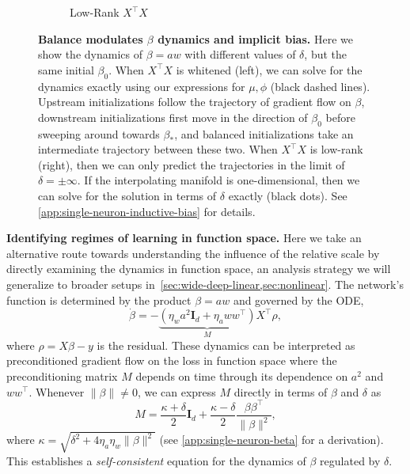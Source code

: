 \documentclass{article}
\theoremstyle{plain}
\theoremstyle{definition}
\theoremstyle{remark}
\begin{document}
\begin{figure}
\begin{subfigure}{0.49\linewidth}
        \caption{Low-Rank $X^\intercal X$}
    \end{subfigure}
    \caption{\textbf{Balance modulates $\beta$ dynamics and implicit bias.}
    Here we show the dynamics of $\beta = a w$ with different values of $\delta$, but the same initial $\beta_0$.
    When $X^\intercal X$ is whitened (left), we can solve for the dynamics exactly using our expressions for $\mu, \phi$ (black dashed lines).
    Upstream initializations follow the trajectory of gradient flow on $\beta$, downstream initializations first move in the direction of $\beta_0$ before sweeping around towards $\beta_*$, and balanced initializations take an intermediate trajectory between these two.
    When $X^\intercal X$ is low-rank (right), then we can only predict the trajectories in the limit of $\delta = \pm \infty$.
    If the interpolating manifold is one-dimensional, then we can solve for the solution in terms of $\delta$ exactly (black dots).
    See \cref{app:single-neuron-inductive-bias} for details.
    }
    \vspace{-15pt}
    \label{fig:single-neuron-beta}
\end{figure}
%
\textbf{Identifying regimes of learning in function space.}
%
Here we take an alternative route towards understanding the influence of the relative scale by directly examining the dynamics in function space, an analysis strategy we will generalize to broader setups in~\cref{sec:wide-deep-linear,sec:nonlinear}.
%
The network's function is determined by the product $\beta = aw$ and governed by the ODE,
\begin{equation}
    \label{eq:beta_c_1_k_1}
    \dot{\beta} = -\underbrace{\left(\eta_w a^2\mathbf{I}_d + \eta_a w w^\intercal\right)}_{M} X^\intercal \rho,
\end{equation}
where $\rho = X \beta - y$ is the residual.
%
These dynamics can be interpreted as preconditioned gradient flow on the loss in function space where the preconditioning matrix $M$ depends on time through its dependence on $a^2$ and $ww^\intercal$.
%
Whenever $\|\beta\| \neq 0$, we can express $M$ directly in terms of $\beta$ and $\delta$ as
\begin{equation}
    \label{eq:M_c=1}
    M = \frac{\kappa + \delta}{2}\mathbf{I}_d + \frac{\kappa - \delta}{2}\frac{\beta\beta^\intercal}{\|\beta\|^2},
\end{equation}
where $\kappa = \sqrt{\delta^2 + 4\eta_a\eta_w\|\beta\|^2}$ (see \cref{app:single-neuron-beta} for a derivation).
%
This establishes a \emph{self-consistent} equation for the dynamics of $\beta$ regulated by $\delta$.
\end{document}
